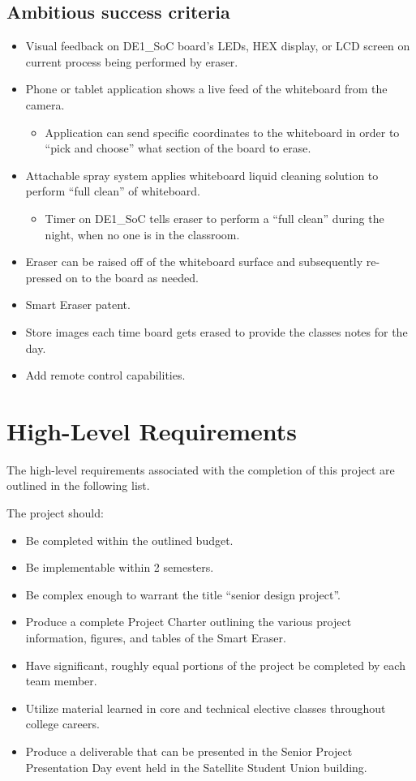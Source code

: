 \subsection{Ambitious success criteria}
\begin{itemize}
\item Visual feedback on DE1\_SoC board's LEDs, HEX display, or LCD screen on current process being performed by eraser.
\item Phone or tablet application shows a live feed of the whiteboard from the camera.
\begin{itemize}
\item Application can send specific coordinates to the whiteboard in order to ``pick and choose'' what section of the board to erase.
\end{itemize}
\item Attachable spray system applies whiteboard liquid cleaning solution to perform ``full clean'' of whiteboard.
\begin{itemize}
\item Timer on DE1\_SoC tells eraser to perform a ``full clean'' during the night, when no one is in the classroom.
\end{itemize}
\item Eraser can be raised off of the whiteboard surface and subsequently re-pressed on to the board as needed.
\item Smart Eraser patent.
\item Store images each time board gets erased to provide the classes notes for the day.
\item Add remote control capabilities.
\end{itemize}
 
 
 \section{High-Level Requirements}
The high-level requirements associated with the completion of this project are outlined in the following list. \par
\setlength{\parindent}{2.5ex} The project should:
\begin{itemize}
\item Be completed within the outlined budget.
\item Be implementable within 2 semesters.
\item Be complex enough to warrant the title ``senior design project''.
\item Produce a complete Project Charter outlining the various project information, figures, and tables of the Smart Eraser.
\item Have significant, roughly equal portions of the project be completed by each team member.
\item Utilize material learned in core and technical elective classes throughout college careers.
\item Produce a deliverable that can be presented in the Senior Project Presentation Day event held in the Satellite Student Union building.
\end{itemize}
 
